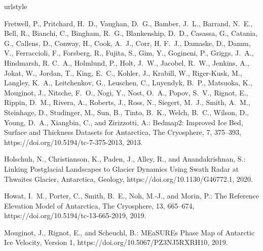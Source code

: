 
%
\begin{thebibliography}{4}
\providecommand{\natexlab}[1]{#1}
\providecommand{\url}[1]{{\tt #1}}
\providecommand{\urlprefix}{URL }
\expandafter\ifx\csname urlstyle\endcsname\relax
  \providecommand{\doi}[1]{https://doi.org/\discretionary{}{}{}#1}\else
  \providecommand{\doi}{https://doi.org/\discretionary{}{}{}\begingroup
  \urlstyle{rm}\Url}\fi

Fretwell, P., Pritchard, H.~D., Vaughan, D.~G., Bamber, J.~L., Barrand, N.~E.,
  Bell, R., Bianchi, C., Bingham, R.~G., Blankenship, D.~D., Casassa, G.,
  Catania, G., Callens, D., Conway, H., Cook, A.~J., Corr, H. F.~J., Damaske,
  D., Damm, V., Ferraccioli, F., Forsberg, R., Fujita, S., Gim, Y., Gogineni,
  P., Griggs, J.~A., Hindmarsh, R. C.~A., Holmlund, P., Holt, J.~W., Jacobel,
  R.~W., Jenkins, A., Jokat, W., Jordan, T., King, E.~C., Kohler, J., Krabill,
  W., {Riger-Kusk}, M., Langley, K.~A., Leitchenkov, G., Leuschen, C.,
  Luyendyk, B.~P., Matsuoka, K., Mouginot, J., Nitsche, F.~O., Nogi, Y., Nost,
  O.~A., Popov, S.~V., Rignot, E., Rippin, D.~M., Rivera, A., Roberts, J.,
  Ross, N., Siegert, M.~J., Smith, A.~M., Steinhage, D., Studinger, M., Sun,
  B., Tinto, B.~K., Welch, B.~C., Wilson, D., Young, D.~A., Xiangbin, C., and
  Zirizzotti, A.: Bedmap2: Improved Ice Bed, Surface and Thickness Datasets for
  {{Antarctica}}, The Cryosphere, 7, 375--393, \doi{10.5194/tc-7-375-2013},
  2013.

Holschuh, N., Christianson, K., Paden, J., Alley, R., and Anandakrishnan, S.:
  Linking Postglacial Landscapes to Glacier Dynamics Using Swath Radar at
  {{Thwaites Glacier}}, {{Antarctica}}, Geology, \doi{10.1130/G46772.1}, 2020.

Howat, I.~M., Porter, C., Smith, B.~E., Noh, M.-J., and Morin, P.: The
  {{Reference Elevation Model}} of {{Antarctica}}, The Cryosphere, 13,
  665--674, \doi{10.5194/tc-13-665-2019}, 2019.

Mouginot, J., Rignot, E., and Scheuchl, B.: {{MEaSUREs Phase Map}} of
  {{Antarctic Ice Velocity}}, {{Version}} 1, \doi{10.5067/PZ3NJ5RXRH10}, 2019.

\end{thebibliography}

%
